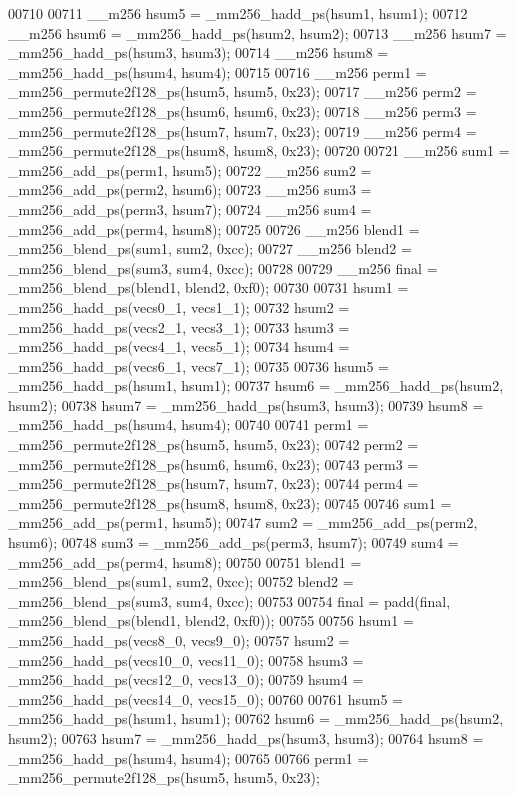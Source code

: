 \begin{DoxyCode}
00710 
00711   \_\_m256 hsum5 = \_mm256\_hadd\_ps(hsum1, hsum1);
00712   \_\_m256 hsum6 = \_mm256\_hadd\_ps(hsum2, hsum2);
00713   \_\_m256 hsum7 = \_mm256\_hadd\_ps(hsum3, hsum3);
00714   \_\_m256 hsum8 = \_mm256\_hadd\_ps(hsum4, hsum4);
00715 
00716   \_\_m256 perm1 = \_mm256\_permute2f128\_ps(hsum5, hsum5, 0x23);
00717   \_\_m256 perm2 = \_mm256\_permute2f128\_ps(hsum6, hsum6, 0x23);
00718   \_\_m256 perm3 = \_mm256\_permute2f128\_ps(hsum7, hsum7, 0x23);
00719   \_\_m256 perm4 = \_mm256\_permute2f128\_ps(hsum8, hsum8, 0x23);
00720 
00721   \_\_m256 sum1 = \_mm256\_add\_ps(perm1, hsum5);
00722   \_\_m256 sum2 = \_mm256\_add\_ps(perm2, hsum6);
00723   \_\_m256 sum3 = \_mm256\_add\_ps(perm3, hsum7);
00724   \_\_m256 sum4 = \_mm256\_add\_ps(perm4, hsum8);
00725 
00726   \_\_m256 blend1 = \_mm256\_blend\_ps(sum1, sum2, 0xcc);
00727   \_\_m256 blend2 = \_mm256\_blend\_ps(sum3, sum4, 0xcc);
00728 
00729   \_\_m256 \textcolor{keyword}{final} = \_mm256\_blend\_ps(blend1, blend2, 0xf0);
00730 
00731   hsum1 = \_mm256\_hadd\_ps(vecs0\_1, vecs1\_1);
00732   hsum2 = \_mm256\_hadd\_ps(vecs2\_1, vecs3\_1);
00733   hsum3 = \_mm256\_hadd\_ps(vecs4\_1, vecs5\_1);
00734   hsum4 = \_mm256\_hadd\_ps(vecs6\_1, vecs7\_1);
00735 
00736   hsum5 = \_mm256\_hadd\_ps(hsum1, hsum1);
00737   hsum6 = \_mm256\_hadd\_ps(hsum2, hsum2);
00738   hsum7 = \_mm256\_hadd\_ps(hsum3, hsum3);
00739   hsum8 = \_mm256\_hadd\_ps(hsum4, hsum4);
00740 
00741   perm1 = \_mm256\_permute2f128\_ps(hsum5, hsum5, 0x23);
00742   perm2 = \_mm256\_permute2f128\_ps(hsum6, hsum6, 0x23);
00743   perm3 = \_mm256\_permute2f128\_ps(hsum7, hsum7, 0x23);
00744   perm4 = \_mm256\_permute2f128\_ps(hsum8, hsum8, 0x23);
00745 
00746   sum1 = \_mm256\_add\_ps(perm1, hsum5);
00747   sum2 = \_mm256\_add\_ps(perm2, hsum6);
00748   sum3 = \_mm256\_add\_ps(perm3, hsum7);
00749   sum4 = \_mm256\_add\_ps(perm4, hsum8);
00750 
00751   blend1 = \_mm256\_blend\_ps(sum1, sum2, 0xcc);
00752   blend2 = \_mm256\_blend\_ps(sum3, sum4, 0xcc);
00753 
00754   \textcolor{keyword}{final} = padd(\textcolor{keyword}{final}, \_mm256\_blend\_ps(blend1, blend2, 0xf0));
00755 
00756   hsum1 = \_mm256\_hadd\_ps(vecs8\_0, vecs9\_0);
00757   hsum2 = \_mm256\_hadd\_ps(vecs10\_0, vecs11\_0);
00758   hsum3 = \_mm256\_hadd\_ps(vecs12\_0, vecs13\_0);
00759   hsum4 = \_mm256\_hadd\_ps(vecs14\_0, vecs15\_0);
00760 
00761   hsum5 = \_mm256\_hadd\_ps(hsum1, hsum1);
00762   hsum6 = \_mm256\_hadd\_ps(hsum2, hsum2);
00763   hsum7 = \_mm256\_hadd\_ps(hsum3, hsum3);
00764   hsum8 = \_mm256\_hadd\_ps(hsum4, hsum4);
00765 
00766   perm1 = \_mm256\_permute2f128\_ps(hsum5, hsum5, 0x23);

\end{DoxyCode}
